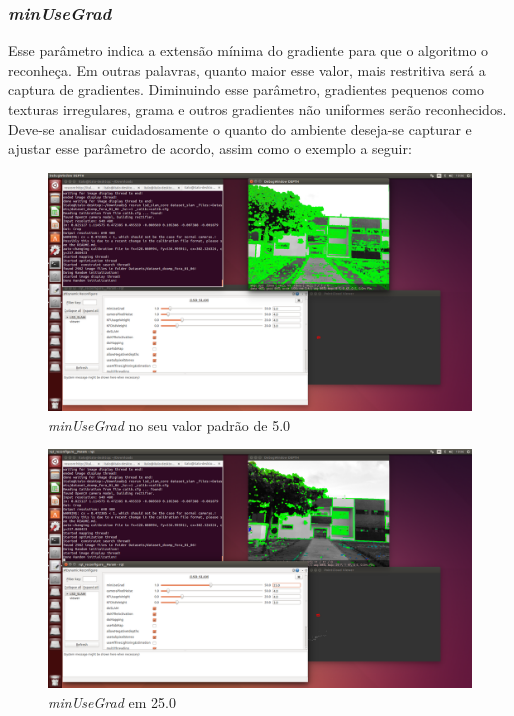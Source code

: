 \subsubsection{\textit{minUseGrad}}

Esse parâmetro indica a extensão mínima do gradiente para que o algoritmo o reconheça. Em outras palavras, quanto maior esse valor, mais restritiva será a captura de gradientes. Diminuindo esse parâmetro, gradientes pequenos como texturas irregulares, grama e outros gradientes não uniformes serão reconhecidos. Deve-se analisar cuidadosamente o quanto do ambiente deseja-se capturar e ajustar esse parâmetro de acordo, assim como o exemplo a seguir:

\begin{figure}[H]
	\centering
		\includegraphics[width= \textwidth]{Imagens/figura3-31.png}
	\caption{\textit{minUseGrad} no seu valor padrão de 5.0}
	\label{fig3:29}
\end{figure}

\begin{figure}[H]
	\centering
		\includegraphics[width= \textwidth]{Imagens/figura3-32.png}
	\caption{\textit{minUseGrad} em 25.0}
	\label{fig3:30}
\end{figure}

